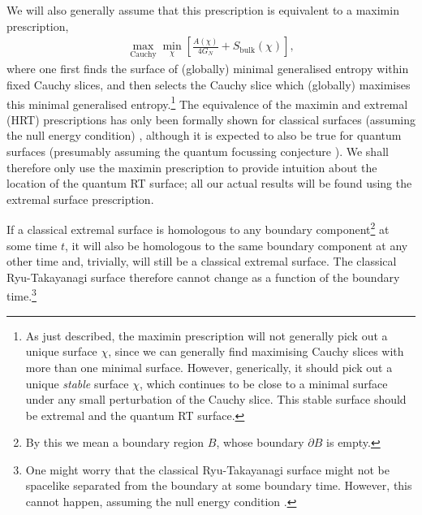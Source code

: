\documentclass[12pt]{article}
\begin{document}
We will also generally assume that this prescription is equivalent to a maximin prescription,
\begin{align}
\max_{\text{Cauchy}} \min_{\chi} \left[\frac{A(\chi)}{4 G_N} + S_\text{bulk}(\chi)\right],
\end{align}
where one first finds the surface of (globally) minimal generalised entropy within fixed Cauchy slices, and then selects the Cauchy slice which (globally) maximises this minimal generalised entropy.\footnote{As just described, the maximin prescription will not generally pick out a unique surface $\chi$, since we can generally find maximising Cauchy slices with more than one minimal surface. However, generically, it should pick out a unique \emph{stable} surface $\chi$, which continues to be close to a minimal surface under any small perturbation of the Cauchy slice. This stable surface should be extremal and the quantum RT surface.} The equivalence of the maximin and extremal (HRT) prescriptions has only been formally shown for classical surfaces (assuming the null energy condition) \cite{wall2014maximin}, although it is expected to also be true for quantum surfaces \cite{engelhardt2015quantum} (presumably assuming the quantum focussing conjecture \cite{bousso2016quantum}). We shall therefore only use the maximin prescription to provide intuition about the location of the quantum RT surface; all our actual results will be found using the extremal surface prescription.

If a classical extremal surface is homologous to any boundary component\footnote{By this we mean a boundary region $B$, whose boundary $\partial B$ is empty.} at some time $t$, it will also be homologous to the same boundary component at any other time and, trivially, will still be a classical extremal surface. The classical Ryu-Takayanagi surface therefore cannot change as a function of the boundary time.\footnote{One might worry that the classical Ryu-Takayanagi surface might not be spacelike separated from the boundary at some boundary time. However, this cannot happen, assuming the null energy condition \cite{wall2014maximin}.}
\end{document}
